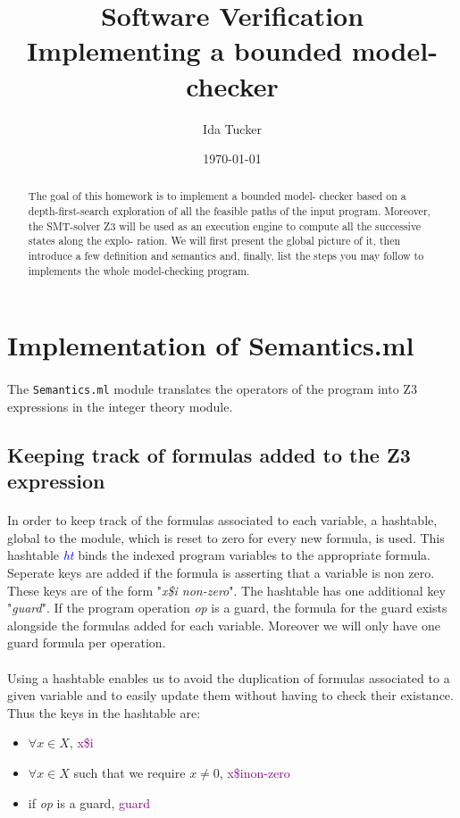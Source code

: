 \documentclass[letterpaper,12pt]{article}
\begin{document}
\title{Software Verification\\
Implementing a bounded model-checker}
\author{Ida Tucker}
\date{\today}
\maketitle

\begin{abstract}
The goal of this homework is to implement a bounded model-
checker based on a depth-first-search exploration of all the feasible paths
of the input program. Moreover, the SMT-solver Z3 will be used as an
execution engine to compute all the successive states along the explo-
ration. We will first present the global picture of it, then introduce a
few definition and semantics and, finally, list the steps you may follow
to implements the whole model-checking program.
\end{abstract}


\section{Implementation of Semantics.ml}
\paragraph{}
The \texttt{Semantics.ml} module translates the operators of the program into Z3 expressions in the integer theory module.
\subsection{Keeping track of formulas added to the Z3 expression}
\paragraph{}
In order to keep track of the formulas associated to each variable, a hashtable, global to the module, which is reset to zero for every new formula, is used. This hashtable \textit{\textcolor{blue}{ht}} binds the indexed program variables to the appropriate formula.
Seperate keys are added if the formula is asserting that a variable is non zero. These keys are of the form "\textit{x\$i non-zero}".
The hashtable has one additional key "\textit{guard}". If the program operation \textit{op} is a guard, the formula for the guard exists alongside the formulas added for each variable. Moreover we will only have one guard formula per operation.
\paragraph{}
Using a hashtable enables us to avoid the duplication of formulas associated to a given variable and to easily update them without having to check their existance. 
Thus the keys in the hashtable are:
\begin{itemize}
\item $\forall x \in X$,  \textcolor{purple}{x\$i}
\item $\forall x \in X$ such that we require $x \neq 0$, \textcolor{purple}{x\$inon-zero}
\item if \textit{op} is a guard, \textcolor{purple}{guard}
\end{itemize}
\end{document}
